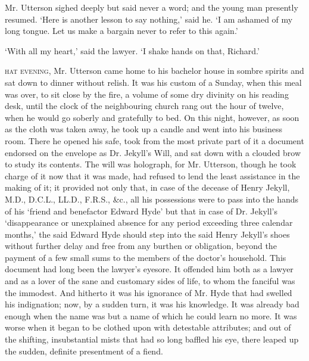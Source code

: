 \documentclass[]{novel}
\begin{document}
Mr. Utterson sighed deeply but said never a word; and the young man presently resumed. ‘Here is another lesson to say nothing,’ said he. ‘I am ashamed of my long tongue. Let us make a bargain never to refer to this again.’

‘With all my heart,’ said the lawyer. ‘I shake hands on that, Richard.’

\clearpage
\label{ch:02}
\begin{ChapterStart}
\vspace*{4\nbs}
\null\vspace{0.75\nbs}
\end{ChapterStart}
\textsc{hat evening,} Mr. Utterson came home to his bachelor house in sombre spirits and sat down to dinner without relish. It was his custom of a Sunday, when this meal was over, to sit close by the fire, a volume of some dry divinity on his reading desk, until the clock of the neighbouring church rang out the hour of twelve, when he would go soberly and gratefully to bed. On this night, however, as soon as the cloth was taken away, he took up a candle and went into his business room. There he opened his safe, took from the most private part of it a document endorsed on the envelope as Dr. Jekyll’s Will, and sat down with a clouded brow to study its contents. The will was holograph, for Mr. Utterson, though he took charge of it now that it was made, had refused to lend the least assistance in the making of it; it provided not only that, in case of the decease of Henry Jekyll, M.D., D.C.L., LL.D., F.R.S., \&c., all his possessions were to pass into the hands of his ‘friend and benefactor Edward Hyde’ but that in case of Dr. Jekyll’s ‘disappearance or unexplained absence for any period exceeding three calendar months,’ the said Edward Hyde should step into the said Henry Jekyll’s shoes without further delay and free from any burthen or obligation, beyond the payment of a few small sums to the members of the doctor’s household. This document had long been the lawyer’s eyesore. It offended him both as a lawyer and as a lover of the sane and customary sides of life, to whom the fanciful was the immodest. And hitherto it was his ignorance of Mr. Hyde that had swelled his indignation; now, by a sudden turn, it was his knowledge. It was already bad enough when the name was but a name of which he could learn no more. It was worse when it began to be clothed upon with detestable attributes; and out of the shifting, insubstantial mists that had so long baffled his eye, there leaped up the sudden, definite presentment of a fiend.
\end{document}
